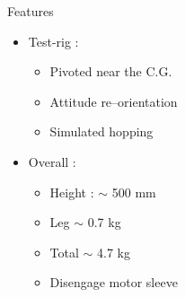 \begin{frame}
\begin{columns}
\begin{block}{Features}
\begin{itemize}
\item
{\greencol Test-rig :}\\[0.1in]
    \begin{itemize}
    \item
    Pivoted near the C.G.\\[0.1in]
    \item
    Attitude re--orientation\\[0.1in]
    \item
    Simulated hopping\\[0.1in]
    \end{itemize}
\item
{\greencol Overall :}\\[0.1in]
    \begin{itemize}
    \item
    Height : $\sim$ 500 mm\\[0.1in]
    \item
    Leg $\sim$ 0.7 kg\\[0.1in]
    \item
    Total $\sim$ 4.7 kg\\[0.1in]
    \item
    Disengage motor sleeve\\[0.1in]
    \end{itemize}
\end{itemize}
\end{block}
\end{columns}
\end{frame}